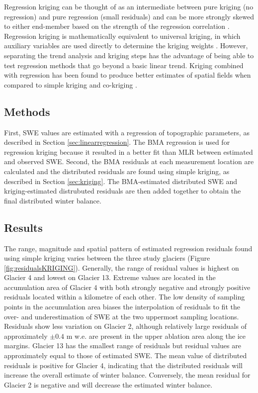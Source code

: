 \documentclass{sfuthesis}
\begin{document}
Regression kriging can be thought of as an intermediate between pure kriging (no regression) and pure regression (small residuals) and can be more strongly skewed to either end-member based on the strength of the regression correlation \citep{Hengl2007}. Regression kriging is mathematically equivalent to universal kriging, in which auxiliary variables are used directly to determine the kriging weights \citep{Hengl2007}. However, separating the trend analysis and kriging steps has the advantage of being able to test regression methods that go beyond a basic linear trend. Kriging combined with regression has been found to produce better estimates of spatial fields when compared to simple kriging and co-kriging \citep{Knotters1995}.

\subsection{Methods}

First, SWE values are estimated with a regression of topographic parameters, as described in Section \ref{sec:linearregression}. The BMA regression is used for regression kriging because it resulted in a better fit than MLR between estimated and observed SWE. Second, the BMA residuals at each measurement location are calculated and the distributed residuals are found using simple kriging, as described in Section \ref{sec:kriging}. The BMA-estimated distributed SWE and kriging-estimated distrubuted residuals are then added together to obtain the final distributed winter balance. 

\subsection{Results}

The range, magnitude and spatial pattern of estimated regression residuals found using simple kriging varies between the three study glaciers (Figure \ref{fig:residualsKRIGING}). Generally, the range of residual values is highest on Glacier 4 and lowest on Glacier 13. Extreme values are located in the accumulation area of Glacier 4 with both strongly negative and strongly positive residuals located within a kilometre of each other. The low density of sampling points in the accumulation area biases the interpolation of residuals to fit the over- and underestimation of SWE at the two uppermost sampling locations. Residuals show less variation on Glacier 2, although relatively large residuals of approximately $\pm 0.4$ m w.e. are present in the upper ablation area along the ice margins. Glacier 13 has the smallest range of residuals but residual values are approximately equal to those of estimated SWE. The mean value of distributed residuals is positive for Glacier 4, indicating that the distributed residuals will increase the overall estimate of winter balance. Conversely, the mean residual for Glacier 2 is negative and will decrease the estimated winter balance. 
\end{document}
